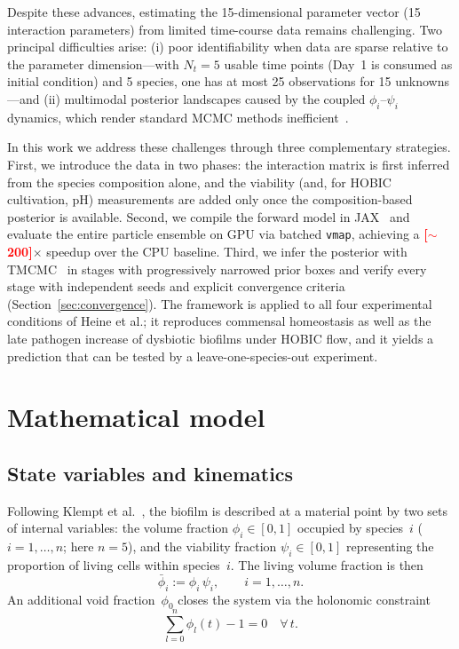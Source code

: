 \documentclass[pdflatex,sn-mathphys-num,lineno]{sn-jnl}
\newcommand{\TBD}[1]{\textcolor{red}{\textbf{[#1]}}}
\begin{document}
Despite these advances, estimating the 15-dimensional parameter vector (15 interaction parameters) from limited time-course data remains challenging.
Two principal difficulties arise: (i) poor identifiability when data are sparse relative to the parameter dimension---with $N_t=5$ usable time points (Day~1 is consumed as initial condition) and 5 species, one has at most 25 observations for 15 unknowns---and (ii) multimodal posterior landscapes caused by the coupled $\phi_i$--$\psi_i$ dynamics, which render standard MCMC methods inefficient~\cite{RobertCasella2004MonteCarlo}.

In this work we address these challenges through three complementary strategies.
First, we introduce the data in two phases: the interaction matrix is first inferred from the species composition alone, and the viability (and, for HOBIC cultivation, pH) measurements are added only once the composition-based posterior is available.
Second, we compile the forward model in JAX~\cite{jax2018github} and evaluate the entire particle ensemble on GPU via batched \texttt{vmap}, achieving a \TBD{$\sim$200}$\times$ speedup over the CPU baseline.
Third, we infer the posterior with TMCMC~\cite{ChingChen2007TMCMC, Betz2016TMCMC} in stages with progressively narrowed prior boxes and verify every stage with independent seeds and explicit convergence criteria (Section~\ref{sec:convergence}).
The framework is applied to all four experimental conditions of Heine et al.; it reproduces commensal homeostasis as well as the late pathogen increase of dysbiotic biofilms under HOBIC flow, and it yields a prediction that can be tested by a leave-one-species-out experiment.

\section{Mathematical model}
\label{sec:model}

\subsection{State variables and kinematics}

Following Klempt et al.~\cite{Klempt2025ContinuumBiofilm, Klempt2024ContinuumGrowth}, the biofilm is described at a material point by two sets of internal variables: the volume fraction $\phi_i \in [0,1]$ occupied by species~$i$ ($i=1,\dots,n$; here $n=5$), and the viability fraction $\psi_i \in [0,1]$ representing the proportion of living cells within species~$i$.
The living volume fraction is then
\begin{equation}
\bar{\phi}_i := \phi_i\,\psi_i,
\qquad i=1,\dots,n.
\label{eq:living}
\end{equation}
An additional void fraction~$\phi_0$ closes the system via the holonomic constraint
\begin{equation}
\sum_{l=0}^{n}\phi_l(t) - 1 = 0 \quad\forall\,t.
\label{eq:constraint}
\end{equation}
\end{document}

